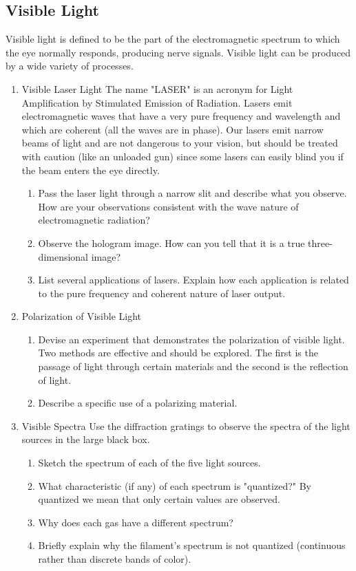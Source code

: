 \subsection{Visible Light} 
Visible light is defined to be the part of the electromagnetic spectrum to which the eye normally responds, producing nerve signals.  Visible light can be produced by a wide variety of processes.
\begin{enumerate}
	\item Visible Laser Light
	The name "LASER" is an acronym for Light Amplification by Stimulated Emission of Radiation.  Lasers emit electromagnetic waves that have a very pure frequency and wavelength and which are coherent (all the waves are in phase).  Our lasers emit narrow beams of light and are not dangerous to your vision, but should be treated with caution (like an unloaded gun) since some lasers can easily blind you if the beam enters the eye directly.
	\begin{enumerate}
		\item Pass the laser light through a narrow slit and describe what you observe.  How are your observations consistent with the wave nature of electromagnetic radiation?
		\item Observe the hologram image.  How can you tell that it is a true three-dimensional image?
		\item List several applications of lasers.  Explain how each application is related to the pure frequency and coherent nature of laser output.
	\end{enumerate}
	
	\item Polarization of Visible Light
	\begin{enumerate}
		\item Devise an experiment that demonstrates the polarization of visible light. Two methods are effective and should be explored. The first is the passage of light through certain materials and the second is the reflection of light.
		\item Describe a specific use of a polarizing material.
	\end{enumerate}
	
	\item Visible Spectra	
		Use the diffraction gratings to observe the spectra of the light sources in the large black box.
	\begin{enumerate}	
		\item Sketch the spectrum of each of the five light sources.
		\item What characteristic (if any) of each spectrum is "quantized?"  By quantized we mean that only certain values are observed.
		\item Why does each gas have a different spectrum?
		\item Briefly explain why the filament's spectrum is not quantized (continuous rather than discrete bands of color).
	\end{enumerate}
\end{enumerate}

